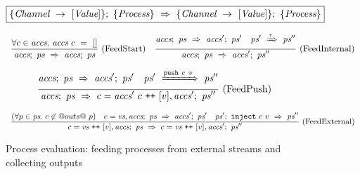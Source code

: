 
\begin{figure}

$$
  \boxed{
    \{\textit{Channel} ~\to~ [\textit{Value}]\};~\{ \textit{Process} \}~\Rightarrow~\{\textit{Channel} ~\to~ [\textit{Value}]\};~\{ \textit{Process} \}
  }
$$

\newcommand\vs {\ti{vs}}
\newcommand\accs {\ti{accs}}
\newcommand\nest {\ti{ps}}

$$
\ruleIN{
  \forall c \in \accs.~
  \accs~c~=~[]
}{
  \ProcsFeed
    {\accs}
    {\nest}
    {\accs}
    {\nest}
}{FeedStart}
%
\ruleIN{
  \ProcsFeed
    {\accs}
    {\nest}
    {\accs'}
    {\nest'}
\quad
  \ProcsShake
    {\nest'}
    {\tau}
    {\nest''}
}{
  \ProcsFeed
    {\accs}
    {\nest}
    {\accs'}
    {\nest''}
}{FeedInternal}
$$

$$
\ruleIN{
  \ProcsFeed
    {\accs}
    {\nest}
    {\accs'}
    {\nest'}
\quad
  \ProcsShake
    {\nest'}
    {\Push~c~v}
    {\nest''}
}{
  \ProcsFeed
    {\accs}
    {\nest}
    {c=\accs'~c \listappend [v], \accs'}
    {\nest''}
}{FeedPush}
$$

$$
\ruleIN{
  (\forall p \in \nest.~c \not\in @outs@~p)
\quad
  \ProcsFeed
    {c=\vs, \accs}
    {\nest}
    {\accs'}
    {\nest'}
\quad
  \ProcsInject
    {\nest'}
    {c}{v}
    {\nest''}
}{
  \ProcsFeed
    {c=\vs \listappend [v], \accs}
    {\nest}
    {c=\vs \listappend [v], \accs'}
    {\nest''}
}{FeedExternal}
$$


\caption{Process evaluation: feeding processes from external streams and collecting outputs}
\label{fig:Process:Eval:Feed}
\end{figure}

